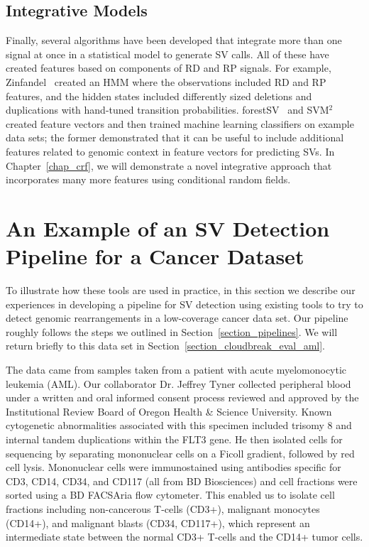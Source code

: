 \subsection{Integrative Models}

Finally, several algorithms have been developed that integrate more than one signal at once in a statistical model to generate SV calls. All of these have created features based on components of RD and RP signals. For example, Zinfandel~\cite{Shen:2011ku} created an HMM where the observations included RD and RP features, and the hidden states included differently sized deletions and duplications with hand-tuned transition probabilities. forestSV~\cite{Michaelson:2012fj} and SVM$^2$~\cite{Chiara:2012ey} created feature vectors and then trained machine learning classifiers on example data sets; the former demonstrated that it can be useful to include additional features related to genomic context in feature vectors for predicting SVs. In Chapter~\ref{chap_crf}, we will demonstrate a novel integrative approach that incorporates many more features using conditional random fields.


\section{An Example of an SV Detection Pipeline for a Cancer Dataset}\label{section_aml_pipeline}

To illustrate how these tools are used in practice, in this section we describe our experiences in developing a pipeline for SV detection using existing tools to try to detect genomic rearrangements in a low-coverage cancer data set. Our pipeline roughly follows the steps we outlined in Section~\ref{section_pipelines}. We will return briefly to this data set in Section~\ref{section_cloudbreak_eval_aml}.

The data came from samples taken from a patient with acute myelomonocytic leukemia (AML). Our collaborator Dr. Jeffrey Tyner collected peripheral blood under a written and oral informed consent process reviewed and approved by the Institutional Review Board of Oregon Health \& Science University. Known cytogenetic abnormalities associated with this specimen included trisomy 8 and internal tandem duplications within the FLT3 gene. He then isolated cells for sequencing by separating mononuclear cells on a Ficoll gradient, followed by red cell lysis. Mononuclear cells were immunostained using antibodies specific for CD3, CD14, CD34, and CD117 (all from BD Biosciences) and cell fractions were sorted using a BD FACSAria flow cytometer. This enabled us to isolate cell fractions including non-cancerous T-cells (CD3+), malignant monocytes (CD14+), and malignant blasts (CD34, CD117+), which represent an intermediate state between the normal CD3+ T-cells and the CD14+ tumor cells. 

